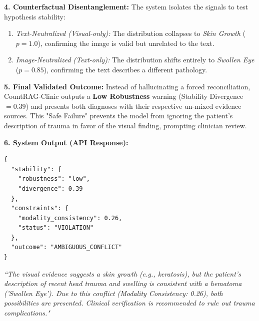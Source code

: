 \textbf{4. Counterfactual Disentanglement:}
The system isolates the signals to test hypothesis stability:
\begin{enumerate}
    \item \textit{Text-Neutralized (Visual-only):} The distribution collapses to \textit{Skin Growth} ($p=1.0$), confirming the image is valid but unrelated to the text.
    \item \textit{Image-Neutralized (Text-only):} The distribution shifts entirely to \textit{Swollen Eye} ($p=0.85$), confirming the text describes a different pathology.
\end{enumerate}

\textbf{5. Final Validated Outcome:}
Instead of hallucinating a forced reconciliation, CountRAG-Clinic outputs a \textbf{Low Robustness} warning (Stability Divergence $= 0.39$) and presents both diagnoses with their respective un-mixed evidence sources. This "Safe Failure" prevents the model from ignoring the patient's description of trauma in favor of the visual finding, prompting clinician review.

\textbf{6. System Output (API Response):}
\begin{verbatim}
{
  "stability": {
    "robustness": "low", 
    "divergence": 0.39 
  },
  "constraints": { 
    "modality_consistency": 0.26, 
    "status": "VIOLATION" 
  },
  "outcome": "AMBIGUOUS_CONFLICT"
}
\end{verbatim}

\textit{``The visual evidence suggests a skin growth (e.g., keratosis), but the patient's description of recent head trauma and swelling is consistent with a hematoma ('Swollen Eye'). Due to this conflict (Modality Consistency: 0.26), both possibilities are presented. Clinical verification is recommended to rule out trauma complications."}
